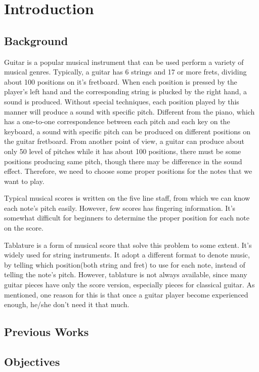 \chapter{Introduction}

\label{Chapter:Introduction}

\section{Background}
Guitar is a popular musical instrument that can be used perform a variety of musical genres.
Typically, a guitar has 6 strings and 17 or more frets, dividing about 100 positions on it's fretboard.
When each position is pressed by the player's left hand and the corresponding string is plucked by the right hand, a sound is produced.
Without special techniques, each position played by this manner will produce a sound with specific pitch.
Different from the piano, which has a one-to-one correspondence between each pitch and each key on the keyboard, a sound with specific pitch can be produced on different positions on the guitar fretboard.
From another point of view, a guitar can produce about only 50 level of pitches while it has about 100 positions, there must be some positions producing same pitch, though there may be difference in the sound effect.
Therefore, we need to choose some proper positions for the notes that we want to play.

Typical musical scores is written on the five line staff, from which we can know each note's pitch easily.
However, few scores has fingering information. It's somewhat difficult for beginners to determine the proper position for each note on the score.

Tablature is a form of musical score that solve this problem to some extent.
It's widely used for string instruments.
It adopt a different format to denote music, by telling which position(both string and fret) to use for each note, instead of telling the note's pitch.
However, tablature is not always available, since many guitar pieces have only the score version, especially pieces for classical guitar.
As \citep{constructing-system} mentioned, one reason for this is that once a guitar player become experienced enough, he/she don't need it that much.

\section{Previous Works}
\section{Objectives}
